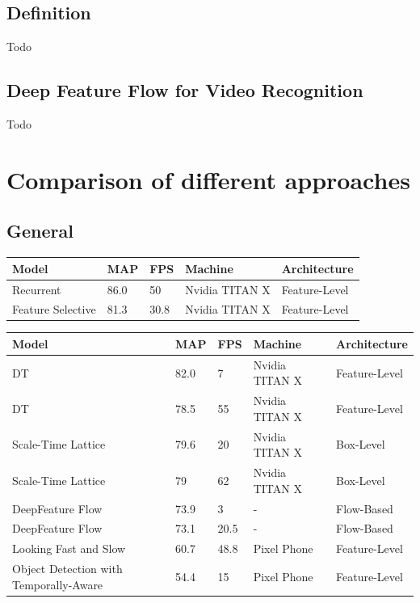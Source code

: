 \documentclass[conference]{IEEEtran}
\begin{document}
\subsection{Definition}
Todo

\subsection{Deep Feature Flow for Video Recognition}
Todo

\section{Comparison of different approaches}

\subsection{General}
\begin{tabular}{ | p{2cm} | p{2em}| p{2em} | p{4em} | p{5em} | } 
 \hline
 Model & MAP & FPS & Machine & Architecture \\
 \hline
 Recurrent \cite{b1} & 86.0 & 50 & Nvidia TITAN X & Feature-Level \\
 \hline
 Feature Selective \cite{b6} & 81.3 & 30.8 & Nvidia TITAN X & Feature-Level \\
 \hline
\end{tabular}

\begin{tabular}{ | p{2cm} | p{2em}| p{2em} | p{4em} | p{5em} | } 
 \hline
 Model & MAP & FPS & Machine & Architecture \\
 \hline
 DT \cite{b8} & 82.0 & 7 & Nvidia TITAN X & Feature-Level \\
 \hline
 DT \cite{b8} & 78.5 & 55 & Nvidia TITAN X & Feature-Level \\
 \hline
 Scale-Time Lattice \cite{b10} & 79.6 & 20 & Nvidia TITAN X & Box-Level \\
 \hline
 Scale-Time Lattice \cite{b10} & 79 & 62 & Nvidia TITAN X & Box-Level \\
 \hline
 DeepFeature Flow \cite{b3} & 73.9 & 3 & - & Flow-Based \\
 \hline
 DeepFeature Flow \cite{b3} & 73.1 & 20.5 & - & Flow-Based \\
 \hline
 Looking Fast and Slow \cite{b7} & 60.7 & 48.8 & Pixel Phone & Feature-Level \\
 \hline
 Object Detection with Temporally-Aware \cite{b2} & 54.4 & 15 & Pixel Phone & Feature-Level \\
 \hline
\end{tabular}
\end{document}

